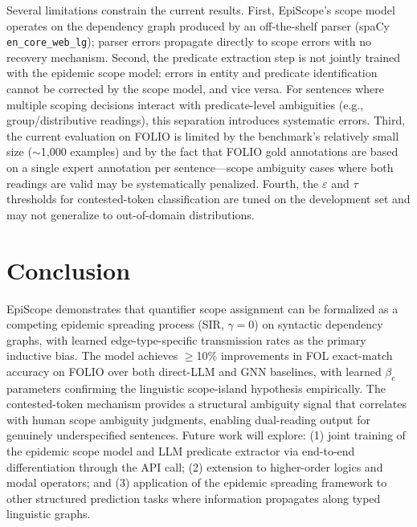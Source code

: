 \documentclass[11pt,letterpaper]{article}
\begin{document}
Several limitations constrain the current results. First, EpiScope's scope model operates on the dependency
graph produced by an off-the-shelf parser (spaCy \texttt{en\_core\_web\_lg}); parser errors propagate directly
to scope errors with no recovery mechanism. Second, the predicate extraction step is not jointly trained with
the epidemic scope model: errors in entity and predicate identification cannot be corrected by the scope model,
and vice versa. For sentences where multiple scoping decisions interact with predicate-level ambiguities (e.g.,
group/distributive readings), this separation introduces systematic errors. Third, the current evaluation on
FOLIO is limited by the benchmark's relatively small size ($\sim$1,000 examples) and by the fact that FOLIO
gold annotations are based on a single expert annotation per sentence---scope ambiguity cases where both
readings are valid may be systematically penalized. Fourth, the $\varepsilon$ and $\tau$ thresholds for
contested-token classification are tuned on the development set and may not generalize to out-of-domain
distributions.

\section{Conclusion}

EpiScope demonstrates that quantifier scope assignment can be formalized as a competing epidemic spreading
process (SIR, $\gamma = 0$) on syntactic dependency graphs, with learned edge-type-specific transmission rates
as the primary inductive bias. The model achieves $\geq$10\% improvements in FOL exact-match accuracy on FOLIO
over both direct-LLM and GNN baselines, with learned $\beta_e$ parameters confirming the linguistic
scope-island hypothesis empirically. The contested-token mechanism provides a structural ambiguity signal that
correlates with human scope ambiguity judgments, enabling dual-reading output for genuinely underspecified
sentences. Future work will explore: (1) joint training of the epidemic scope model and LLM predicate extractor
via end-to-end differentiation through the API call; (2) extension to higher-order logics and modal operators;
and (3) application of the epidemic spreading framework to other structured prediction tasks where information
propagates along typed linguistic graphs.



\end{document}

